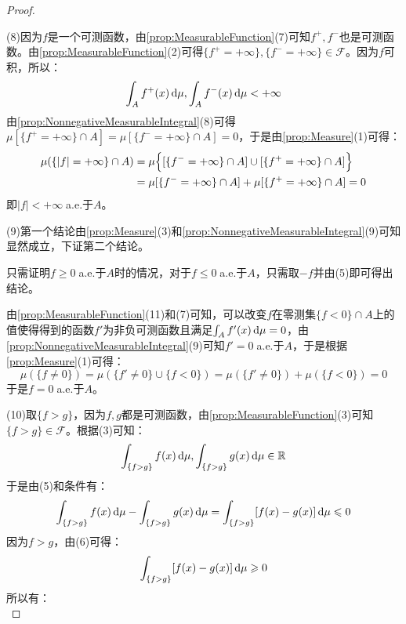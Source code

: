 \begin{proof}
\begin{equation*}
	\end{equation*}\par
	(8)因为$f$是一个可测函数，由\cref{prop:MeasurableFunction}(7)可知$f^+,f^-$也是可测函数。由\cref{prop:MeasurableFunction}(2)可得$\{f^+=+\infty\},\{f^-=+\infty\}\in \mathscr{F}$。因为$f$可积，所以：
	\begin{equation*}
		\int_{A}f^+(x)\mathop{}\!\mathrm{d}\mu,\int_{A}f^-(x)\mathop{}\!\mathrm{d}\mu<+\infty
	\end{equation*}
	由\cref{prop:NonnegativeMeasurableIntegral}(8)可得$\mu[\{f^+=+\infty\}\cap A]=\mu[\{f^-=+\infty\}\cap A]=0$，于是由\cref{prop:Measure}(1)可得：
	\begin{align*}
		\mu(\{|f|=+\infty\}\cap A)&=\mu\Bigl\{[\{f^-=+\infty\}\cap A]\cup[\{f^+=+\infty\}\cap A]\Bigr\} \\
		&=\mu[\{f^-=+\infty\}\cap A]+\mu[\{f^+=+\infty\}\cap A]=0
	\end{align*}
	即$|f|<+\infty\;$a.e.于$A$。\par
	(9)第一个结论由\cref{prop:Measure}(3)和\cref{prop:NonnegativeMeasurableIntegral}(9)可知显然成立，下证第二个结论。\par
	只需证明$f\geqslant0\;$a.e.于$A$时的情况，对于$f\leqslant0\;$a.e.于$A$，只需取$-f$并由(5)即可得出结论。\par 
	由\cref{prop:MeasurableFunction}(11)和(7)可知，可以改变$f$在零测集$\{f<0\}\cap A$上的值使得得到的函数$f'$为非负可测函数且满足$\int_{A}f'(x)\mathop{}\!\mathrm{d}\mu=0$，由\cref{prop:NonnegativeMeasurableIntegral}(9)可知$f'=0\;$a.e.于$A$，于是根据\cref{prop:Measure}(1)可得：
	\begin{equation*}
		\mu(\{f\ne0\})=\mu(\{f'\ne0\}\cup\{f<0\})=\mu(\{f'\ne0\})+\mu(\{f<0\})=0
	\end{equation*}
	于是$f=0\;$a.e.于$A$。\par
	(10)取$\{f>g\}$，因为$f,g$都是可测函数，由\cref{prop:MeasurableFunction}(3)可知$\{f>g\}\in \mathscr{F}$。根据(3)可知：
	\begin{equation*}
		\int_{\{f>g\}}f(x)\mathop{}\!\mathrm{d}\mu,\int_{\{f>g\}}g(x)\mathop{}\!\mathrm{d}\mu\in\mathbb{R}
	\end{equation*}
	于是由(5)和条件有：
	\begin{equation*}
		\int_{\{f>g\}}f(x)\mathop{}\!\mathrm{d}\mu-\int_{\{f>g\}}g(x)\mathop{}\!\mathrm{d}\mu=\int_{\{f>g\}}[f(x)-g(x)]\mathop{}\!\mathrm{d}\mu\leqslant0
	\end{equation*}
	因为$f>g$，由(6)可得：
	\begin{equation*}
		\int_{\{f>g\}}[f(x)-g(x)]\mathop{}\!\mathrm{d}\mu\geqslant0
	\end{equation*}
	所以有：
	\begin{equation*}

\end{equation*}
\end{proof}
